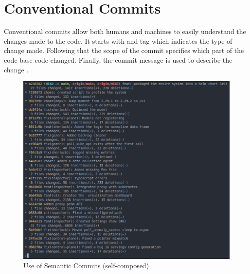 \section{Conventional Commits}

Conventional commits allow both humans and machines to easily understand the changes made to the code. It starts with and tag which indicates the type of change made. Following that the scope of the commit specifies which part of the code base code changed. Finally, the commit message is used to describe the change \citep{Conventi55:online}.

\begin{figure}[H]
    \includegraphics[width=16.5cm]{assets/appendix/commits.png}
    \caption{Use of Semantic Commits (self-composed)}
\end{figure}